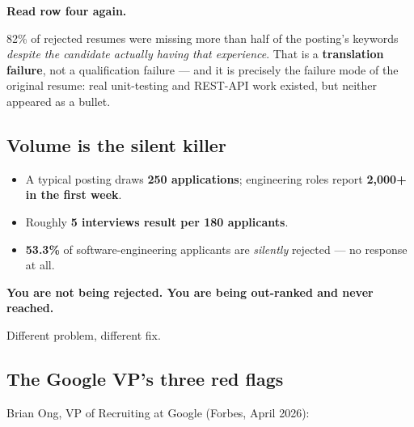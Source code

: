 \documentclass[11pt,a4paper]{article}
\newcommand{\keyfinding}[1]{\par\vspace{3pt}\noindent\textcolor{warn}{\textbf{#1}}\par\vspace{2pt}}
\begin{document}
\keyfinding{Read row four again.}
82\% of rejected resumes were missing more than half of the posting's keywords
\emph{despite the candidate actually having that experience}. That is a \textbf{translation
failure}, not a qualification failure --- and it is precisely the failure mode of the original
resume: real unit-testing and REST-API work existed, but neither appeared as a bullet.

\subsection{Volume is the silent killer}
\begin{itemize}
  \item A typical posting draws \textbf{250 applications}; engineering roles report
        \textbf{2{,}000+ in the first week}.
  \item Roughly \textbf{5 interviews result per 180 applicants}.
  \item \textbf{53.3\%} of software-engineering applicants are \emph{silently} rejected ---
        no response at all.
\end{itemize}

\keyfinding{You are not being rejected. You are being out-ranked and never reached.}
Different problem, different fix.

\subsection{The Google VP's three red flags}

Brian Ong, VP of Recruiting at Google (Forbes, April 2026):
\end{document}
